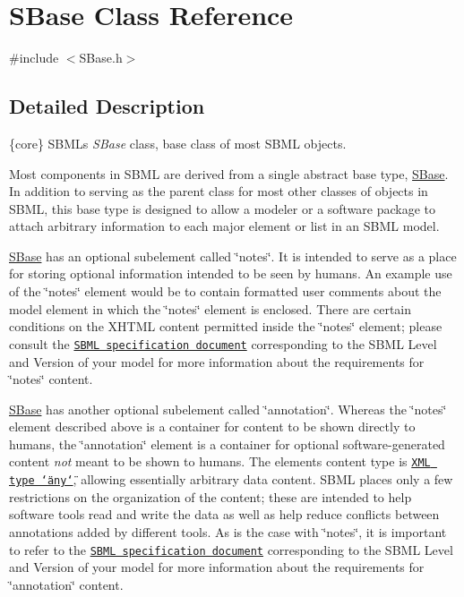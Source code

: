 \hypertarget{class_s_base}{}\section{S\+Base Class Reference}
\label{class_s_base}


{\ttfamily \#include $<$S\+Base.\+h$>$}



\subsection{Detailed Description}
\{core\} S\+B\+ML\textquotesingle{}s {\itshape S\+Base} class, base class of most S\+B\+ML objects.

Most components in S\+B\+ML are derived from a single abstract base type, \hyperlink{class_s_base}{S\+Base}. In addition to serving as the parent class for most other classes of objects in S\+B\+ML, this base type is designed to allow a modeler or a software package to attach arbitrary information to each major element or list in an S\+B\+ML model.

\hyperlink{class_s_base}{S\+Base} has an optional subelement called \char`\"{}notes\char`\"{}. It is intended to serve as a place for storing optional information intended to be seen by humans. An example use of the \char`\"{}notes\char`\"{} element would be to contain formatted user comments about the model element in which the \char`\"{}notes\char`\"{} element is enclosed. There are certain conditions on the X\+H\+T\+ML content permitted inside the \char`\"{}notes\char`\"{} element; please consult the \href{http://sbml.org/Documents/Specifications}{\tt S\+B\+ML specification document} corresponding to the S\+B\+ML Level and Version of your model for more information about the requirements for \char`\"{}notes\char`\"{} content.

\hyperlink{class_s_base}{S\+Base} has another optional subelement called \char`\"{}annotation\char`\"{}. Whereas the \char`\"{}notes\char`\"{} element described above is a container for content to be shown directly to humans, the \char`\"{}annotation\char`\"{} element is a container for optional software-\/generated content {\itshape not} meant to be shown to humans. The element\textquotesingle{}s content type is \href{http://www.w3.org/TR/2004/REC-xml-20040204/#elemdecls}{\tt X\+ML type \char`\"{}any\char`\"{}}, allowing essentially arbitrary data content. S\+B\+ML places only a few restrictions on the organization of the content; these are intended to help software tools read and write the data as well as help reduce conflicts between annotations added by different tools. As is the case with \char`\"{}notes\char`\"{}, it is important to refer to the \href{http://sbml.org/Documents/Specifications}{\tt S\+B\+ML specification document} corresponding to the S\+B\+ML Level and Version of your model for more information about the requirements for \char`\"{}annotation\char`\"{} content.

